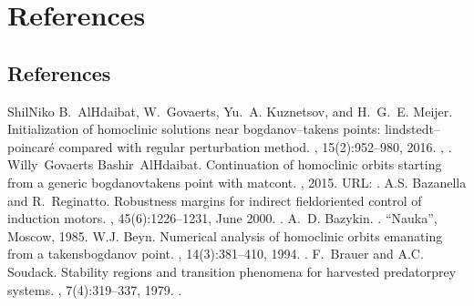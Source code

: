 \documentclass[letterpaper,10pt,english]{jupyterBook}
\begin{document}
\noindent{}


\part{References}


\chapter{References}
\label{\detokenize{references:references}}\label{\detokenize{references::doc}}
\sphinxAtStartPar


\begin{sphinxthebibliography}{ShilNiko}
\sphinxAtStartPar
B. Al\sphinxhyphen{}Hdaibat, W. Govaerts, Yu. A. Kuznetsov, and H. G. E. Meijer. Initialization of homoclinic solutions near bogdanov–takens points: lindstedt–poincaré compared with regular perturbation method. , 15(2):952–980, 2016. , .
\sphinxAtStartPar
Willy Govaerts Bashir Al\sphinxhyphen{}Hdaibat. Continuation of homoclinic orbits starting from a generic bogdanov\sphinxhyphen{}takens point with matcont. , 2015. URL: .
\sphinxAtStartPar
A.S. Bazanella and R. Reginatto. Robustness margins for indirect field\sphinxhyphen{}oriented control of induction motors. , 45(6):1226–1231, June 2000. .
\sphinxAtStartPar
A. D. Bazykin. . “Nauka”, Moscow, 1985.
\sphinxAtStartPar
W.\sphinxhyphen{}J. Beyn. Numerical analysis of homoclinic orbits emanating from a takens\sphinxhyphen{}bogdanov point. , 14(3):381–410, 1994. .
\sphinxAtStartPar
F. Brauer and A.C. Soudack. Stability regions and transition phenomena for harvested predator\sphinxhyphen{}prey systems. , 7(4):319–337, 1979. .

\end{sphinxthebibliography}
\end{document}

